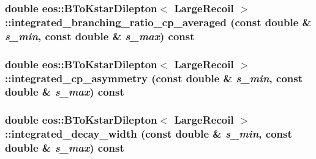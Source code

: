 \label{classeos_1_1BToKstarDilepton_3_01LargeRecoil_01_4_a7a272263b3e040fabd6a78bb54557dbf}
\hypertarget{classeos_1_1BToKstarDilepton_3_01LargeRecoil_01_4_a50645c68f1852c1746ad770de4de9de4}{
\subsubsection[{integrated\_\-branching\_\-ratio\_\-cp\_\-averaged}]{\setlength{\rightskip}{0pt plus 5cm}double eos::BToKstarDilepton$<$ {\bf LargeRecoil} $>$::integrated\_\-branching\_\-ratio\_\-cp\_\-averaged (const double \& {\em s\_\-min}, \/  const double \& {\em s\_\-max}) const}}
\label{classeos_1_1BToKstarDilepton_3_01LargeRecoil_01_4_a50645c68f1852c1746ad770de4de9de4}
\hypertarget{classeos_1_1BToKstarDilepton_3_01LargeRecoil_01_4_a3d22ecca150af1e00e707c14fe047969}{
\subsubsection[{integrated\_\-cp\_\-asymmetry}]{\setlength{\rightskip}{0pt plus 5cm}double eos::BToKstarDilepton$<$ {\bf LargeRecoil} $>$::integrated\_\-cp\_\-asymmetry (const double \& {\em s\_\-min}, \/  const double \& {\em s\_\-max}) const}}
\label{classeos_1_1BToKstarDilepton_3_01LargeRecoil_01_4_a3d22ecca150af1e00e707c14fe047969}
\hypertarget{classeos_1_1BToKstarDilepton_3_01LargeRecoil_01_4_adbfb9ebdedeba02edf74bf82ca7c1b6e}{
\subsubsection[{integrated\_\-decay\_\-width}]{\setlength{\rightskip}{0pt plus 5cm}double eos::BToKstarDilepton$<$ {\bf LargeRecoil} $>$::integrated\_\-decay\_\-width (const double \& {\em s\_\-min}, \/  const double \& {\em s\_\-max}) const}}

